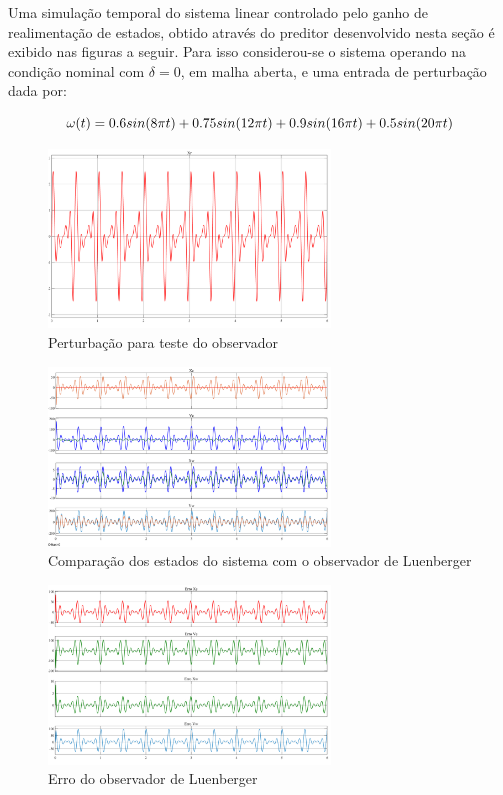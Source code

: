 Uma simulação temporal do sistema linear controlado pelo ganho de realimentação de estados, obtido através do preditor desenvolvido nesta seção é exibido nas figuras a seguir. Para isso considerou-se o sistema operando na condição nominal com $\delta=0$, em malha aberta, e uma entrada de perturbação dada por:

\begin{equation*} \footnotesize
    \omega(t)=0.6sin(8\pi t)+0.75sin(12\pi t)+0.9sin(16\pi t)+0.5sin(20\pi t)
\end{equation*}

\FloatBarrier
\begin{figure}[htbp]
    \begin{centering}
    \includegraphics[width=7.5cm]{img/estatdos_perturbacao.png} 
    \caption{Perturbação para teste do observador}
    \label{fig:estatdos_perturbacao}
    \end{centering}
\end{figure}
\FloatBarrier

\FloatBarrier
\begin{figure}[htbp]
    \begin{centering}
    \includegraphics[width=7.5cm]{img/estatdos_luenberger.png} 
    \caption{Comparação dos estados do sistema com o observador de Luenberger}
    \label{fig:estatdos_luenberger}
    \end{centering}
\end{figure}
\FloatBarrier

\FloatBarrier
\begin{figure}[htbp]
    \begin{centering}
    \includegraphics[width=7.5cm]{img/estatdos_erro_luenberg.png} 
    \caption{Erro do observador de Luenberger}
    \label{fig:estatdos_erro_luenberg}
    \end{centering}
\end{figure}
\FloatBarrier